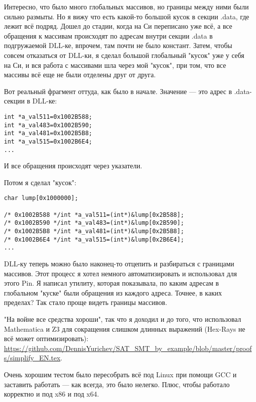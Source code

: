Интересно, что было много глобальных массивов, но границы между ними были сильно размыты.
Но я вижу что есть какой-то большой кусок в секции .data, где лежит всё подряд.
Дошел до стадии, когда на Си переписано уже всё, а все обращения к массивам происходят по адресам внутри секции .data в 
подгружаемой DLL-ке, впрочем, там почти не было констант.
Затем, чтобы совсем отказаться от DLL-ки, я сделал большой глобальный "кусок" уже у себя на Си, и вся работа с массивами
шла через мой "кусок", при том, что все массивы всё еще не были отделены друг от друга.

Вот реальный фрагмент оттуда, как было в начале.
Значение --- это адрес в .data-секции в DLL-ке:

\begin{lstlisting}
int *a_val511=0x1002B588;
int *a_val483=0x1002B590;
int *a_val481=0x1002B5B8;
int *a_val515=0x1002B6E4;
...
\end{lstlisting}

И все обращения происходят через указатели.

Потом я сделал "кусок":

\begin{lstlisting}
char lump[0x1000000];

/* 0x1002B588 */int *a_val511=(int*)&lump[0x2B588];
/* 0x1002B590 */int *a_val483=(int*)&lump[0x2B590];
/* 0x1002B5B8 */int *a_val481=(int*)&lump[0x2B5B8];
/* 0x1002B6E4 */int *a_val515=(int*)&lump[0x2B6E4];
...
\end{lstlisting}

DLL-ку теперь можно было наконец-то отцепить и разбираться с границами массивов.
Этот процесс я хотел немного автоматизировать и использовал для этого Pin.
Я написал утилиту, которая показывала, по каким адресам в глобальном "куске" были обращения
из каждого адреса. Точнее, в каких пределах?
Так стало проще видеть границы массивов.

"На войне все средства хороши", так что я доходил и до того, что использовал Mathematica и Z3 для сокращения слишком длинных
выражений (Hex-Rays не всё может оптимизировать): \\
\url{https://github.com/DennisYurichev/SAT_SMT_by_example/blob/master/proofs/simplify_EN.tex}.

Очень хорошим тестом было пересобрать всё под Linux при помощи GCC и заставить работать --- как всегда, это было нелегко.
Плюс, чтобы работало корректно и под x86 и под x64.

